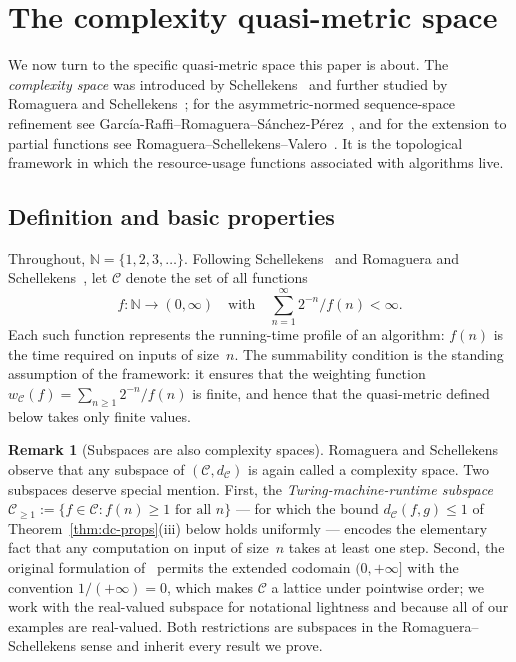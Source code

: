 \documentclass[11pt,a4paper]{article}
\theoremstyle{plain}
\theoremstyle{definition}
\newtheorem{remarkinner}[theoreminner]{Remark}
\newenvironment{remark}[1][]{\begin{remarkinner}[#1]}{\end{remarkinner}}
\newcommand{\N}{\mathbb{N}}
\newcommand{\C}{\mathcal{C}}
\begin{document}
\section{The complexity quasi-metric space}
\label{sec:complexity-space}

We now turn to the specific quasi-metric space this paper is
about.  The \emph{complexity space} was introduced by
Schellekens~\cite{schellekens1995} and further studied by Romaguera
and Schellekens~\cite{romaguera1999}; for the asymmetric-normed
sequence-space refinement see
Garc\'{i}a-Raffi--Romaguera--S\'anchez-P\'erez~\cite{garcia-raffi2002},
and for the extension to partial functions see
Romaguera--Schellekens--Valero~\cite{romaguera-schellekens-valero2011}.
It is the topological framework in which the resource-usage
functions associated with algorithms live.

\subsection{Definition and basic properties}

Throughout, $\N=\{1,2,3,\dots\}$.  Following
Schellekens~\cite{schellekens1995} and Romaguera and
Schellekens~\cite{romaguera1999}, let $\C$ denote the set of all
functions
\[
  f\colon\N\to(0,\infty)\quad\text{with}\quad
  \sum_{n=1}^\infty 2^{-n}/f(n)<\infty.
\]
Each such function represents the running-time profile of an
algorithm: $f(n)$ is the time required on inputs of size~$n$.  The
summability condition is the standing assumption of the framework:
it ensures that the weighting function $w_\C(f)=\sum_{n\ge 1}
2^{-n}/f(n)$ is finite, and hence that the quasi-metric defined
below takes only finite values.

\begin{remark}[Subspaces are also complexity spaces]\label{rem:subspace-convention}
Romaguera and Schellekens~\cite{romaguera1999} observe that any
subspace of $(\C,d_\C)$ is again called a complexity space.  Two
subspaces deserve special mention.  First, the
\emph{Turing-machine-runtime subspace}
$\C_{\ge 1}:=\{f\in\C: f(n)\ge 1 \text{ for all }n\}$ — for which
the bound $d_\C(f,g)\le 1$ of Theorem~\ref{thm:dc-props}(iii) below
holds uniformly — encodes the elementary fact that any computation
on input of size~$n$ takes at least one step.  Second, the original
formulation of~\cite{romaguera1999} permits the extended codomain
$(0,+\infty]$ with the convention $1/(+\infty)=0$, which makes
$\C$ a lattice under pointwise order; we work with the real-valued
subspace for notational lightness and because all of our examples
are real-valued.  Both restrictions are subspaces in the
Romaguera--Schellekens sense and inherit every result we prove.
\end{remark}
\end{document}
